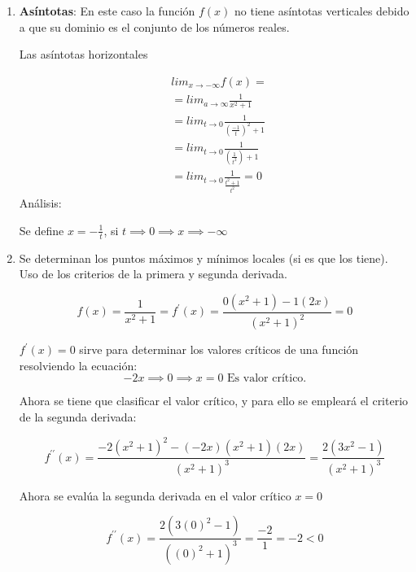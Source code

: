 \begin{enumerate}
	\item \textbf{Asíntotas}: En este caso la función $f(x)$ no tiene asíntotas verticales debido a que su dominio es el conjunto de los números reales.

	      Las asíntotas horizontales

	      \begin{align*}
		       & lim_{x\to -\infty}f(x)=                              \\
		       & =lim_{a\to \infty} \frac{1}{x^2+1}                   \\
		       & =lim_{t\to 0}\frac{1}{\left(\frac{-1}{t}\right)^2+1} \\
		       & =lim_{t\to 0}\frac{1}{\left(\frac{1}{t^2} \right)+1} \\
		       & =lim_{t\to 0}\frac{1}{\frac{t^2+1}{t^2}}=0
	      \end{align*}
	      Análisis:

	      Se define $x=-\frac{1}{t}$, si $t\implies 0 \implies x\implies -\infty$
	\item Se determinan los puntos máximos y mínimos locales (si es que los tiene). Uso de los criterios de la primera y segunda derivada.

	      \begin{equation*}
		      f(x)=\frac{1}{x^2+1}=f^{\prime}(x)=\frac{0\left( x^2+1 \right)-1\left( 2x \right)}{\left( x^2+1 \right)^2}=0
	      \end{equation*}

	      $f^{\prime}(x)=0$ sirve para determinar los valores críticos de una función
	      resolviendo la ecuación:
	      \begin{equation*}
		      -2x \implies 0\implies x=0 \text{ Es valor crítico.}
	      \end{equation*}

	      Ahora se tiene que clasificar el valor crítico, y para ello se empleará el criterio de la segunda derivada:

	      \begin{equation*}
		      f^{\prime\prime}(x)=\frac{-2\left(x^2+1 \right)^2-\left(-2x \right)\left(x^2+1 \right)\left( 2x\right)}{\left( x^2+1\right)^3}= \frac{2\left( 3x^2-1\right)}{\left(x^2+1 \right)^3}
	      \end{equation*}

	      Ahora se evalúa la segunda derivada en el valor crítico $x=0$

	      \begin{equation*}
		      f^{\prime\prime}(x)=\frac{2\left( 3(0)^2-1\right)}{\left((0)^2+1 \right)^3}=\frac{-2}{1}=-2<0
	      \end{equation*}


\end{enumerate}
